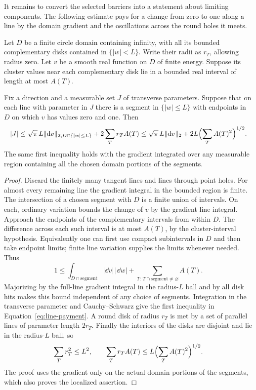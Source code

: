It remains to convert the selected barriers into a statement about
limiting components.  The following estimate pays for a change from zero
to one along a line by the domain gradient and the oscillations across
the round holes it meets.

\begin{lemma}
\label{lem:line-payment}
Let $D$ be a finite circle domain containing infinity, with all its
bounded complementary disks contained in $\{|w|<L\}$.  Write their
radii as $r_T$, allowing radius zero.  Let $v$ be a smooth real function
on $D$ of finite energy.  Suppose its cluster values near each
complementary disk lie in a bounded real interval of length at most
$A(T)$.

Fix a direction and a measurable set $J$ of transverse parameters.
Suppose that on each line with parameter in $J$ there is a segment in
$\{|w|\le L\}$ with endpoints in $D$ on which $v$ has values zero and
one.  Then
\begin{equation}
 \label{eq:line-payment}
 |J|\le\sqrt{\pi}\,L\|\mathrm d v\|_{2,D\cap\{|w|\le L\}}
       +2\sum_T r_T A(T)
 \le\sqrt{\pi}\,L\|\mathrm d v\|_2
       +2L\Bigl(\sum_T A(T)^2\Bigr)^{1/2}.
\end{equation}
The same first inequality holds with the gradient integrated over any
measurable region containing all the chosen domain portions of the
segments.
\end{lemma}

\begin{proof}
Discard the finitely many tangent lines and lines through point holes.
For almost every remaining line the gradient integral in the bounded
region is finite.  The intersection of a chosen segment with $D$ is a
finite union of intervals.  On each, ordinary variation bounds the
change of $v$ by the gradient line integral.  Approach the endpoints of
the complementary intervals from within $D$.  The difference across
each such interval is at most $A(T)$, by the cluster-interval
hypothesis.  Equivalently one can first use compact subintervals in
$D$ and then take endpoint limits; finite line variation supplies the
limits whenever needed.  Thus
\[
 1\le
 \int_{D\cap\text{segment}}|\dd v|\,|\dd w|
 +\sum_{T:\,T\cap\text{segment}\ne\varnothing}A(T).
\]
Majorizing by the full-line gradient integral in the radius-$L$ ball
and by all disk hits makes this bound independent of any choice of
segments.  Integration in the transverse parameter and Cauchy--Schwarz
give the first inequality in Equation~\eqref{eq:line-payment}.  A round
disk of radius $r_T$ is met by a set of parallel lines of parameter
length $2r_T$.  Finally the interiors of the disks are disjoint and
lie in the radius-$L$ ball, so
\[
 \sum_T r_T^2\le L^2,
 \qquad
 \sum_T r_T A(T)
 \le L\Bigl(\sum_T A(T)^2\Bigr)^{1/2}.
\]
The proof uses the gradient only on the actual domain portions of the
segments, which also proves the localized assertion.
\end{proof}

